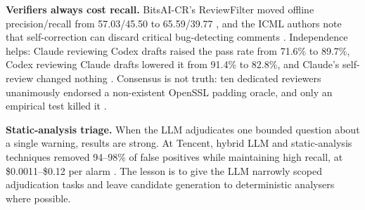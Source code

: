 \textbf{Verifiers always cost recall.} BitsAI-CR's ReviewFilter moved offline precision/recall from 57.03/45.50 to 65.59/39.77 \cite{sun2025bitsai}, and the ICML authors note that self-correction can discard critical bug-detecting comments \cite{lu2025towards}. Independence helps: Claude reviewing Codex drafts raised the pass rate from 71.6\% to 89.7\%, Codex reviewing Claude drafts lowered it from 91.4\% to 82.8\%, and Claude's self-review changed nothing \cite{xiang2026crossmodel}. Consensus is not truth: ten dedicated reviewers unanimously endorsed a non-existent OpenSSL padding oracle, and only an empirical test killed it \cite{agarwal2026refute}.

\textbf{Static-analysis triage.} When the LLM adjudicates one bounded question about a single warning, results are strong. At Tencent, hybrid LLM and static-analysis techniques removed 94--98\% of false positives while maintaining high recall, at \$0.0011--\$0.12 per alarm \cite{du2026reducing}. The lesson is to give the LLM narrowly scoped adjudication tasks and leave candidate generation to deterministic analysers where possible.
